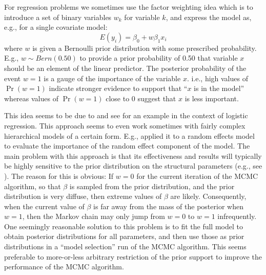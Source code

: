For regression problems we sometimes use the factor weighting idea
which is to introduce a set of binary variables $w_{k}$ for variable
$k$, and express the model as, e.g., for a single covariate model:
 \[
 E(y_i) = \beta_0 + w \beta_1 x_{i}
\]
where $w$ is given a Bernoulli prior distribution with some prescribed
probability. E.g., $w \sim Bern(0.50)$ to provide a prior probability
of 0.50 that variable $x$ should be an element of the linear
predictor. The posterior probability of the event $w=1$ is a gauge of
the importance of the variable $x$. i.e., high values of $\Pr(w=1)$
indicate stronger evidence to support that ``$x$ is in the model''
whereas values of $\Pr(w=1)$ close to 0 suggest that $x$ is less
important.



This idea seems to be due to \citet{kuo_mallick:1998} and see
\citet[][Chapt. 3]{royle_dorazio:2008} for an example in the context
of logistic regression. This approach seems to even work sometimes
with fairly complex hierarchical models of a certain form. E.g.,
\citet{royle:2008} applied it to a random effects model to evaluate
the importance of the random effect component of the model.  The main
problem with this approach is that its effectiveness and results will
typically be highly sensitive to the prior distribution on the
structural parameters (e.g., see \citet[][table xyz]{royle_dorazio:2008}).
The reason for this is obvious: If $w = 0$ for the current
iteration of the MCMC algorithm, so that $\beta$ is sampled from the
prior distribution, and the prior distribution is very diffuse, then
extreme values of $\beta$ are likely. Consequently, when the current value of
$\beta$ is
far away from the mass of the posterior when $w=1$, then the Markov
chain may only jump from $w=0$ to $w=1$ infrequently.  One seemingly
reasonable solution to this problem \citep{aitkin:1991}
is to fit the full
model to obtain posterior distributions for all parameters, and then
use those as prior distributions in a ``model selection'' run of the
MCMC algorithm.  This seems preferable to more-or-less arbitrary restriction of
the prior support to improve the performance of the MCMC algorithm.

